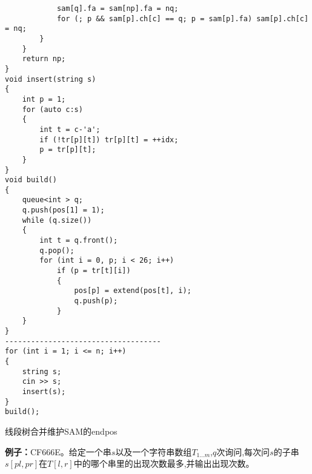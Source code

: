 \documentclass[a4paper, fontset=none]{ctexart}
\begin{document}
\begin{verbatim}
            sam[q].fa = sam[np].fa = nq;
            for (; p && sam[p].ch[c] == q; p = sam[p].fa) sam[p].ch[c] = nq;
        }
    }
    return np;
}
void insert(string s)
{
    int p = 1;
    for (auto c:s)
    {
        int t = c-'a';
        if (!tr[p][t]) tr[p][t] = ++idx;
        p = tr[p][t];
    }
}
void build()
{
    queue<int > q;
    q.push(pos[1] = 1);
    while (q.size())
    {
        int t = q.front();
        q.pop();
        for (int i = 0, p; i < 26; i++)
            if (p = tr[t][i])
            {
                pos[p] = extend(pos[t], i);
                q.push(p);
            }
    }
}
------------------------------------
for (int i = 1; i <= n; i++)
{
    string s;
    cin >> s;
    insert(s);
}
build();
\end{verbatim}

线段树合并维护SAM的endpos

\textbf{例子：}CF666E。给定一个串$s$以及一个字符串数组$T_{1\ldots m}$,$q$次询问,每次问$s$的子串$s[pl, pr]$在$T[l, r]$中的哪个串里的出现次数最多,并输出出现次数。
\end{document}
